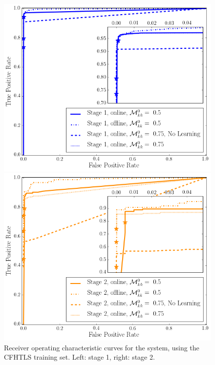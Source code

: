 \documentclass[useAMS,usenatbib,a4paper]{mn2e}
\begin{document}
\begin{figure}
\begin{minipage}{0.45\linewidth}
  \centering\includegraphics[width=\linewidth]{sw-system-figs/stage1_ROC.png}
\end{minipage}\hfill
\begin{minipage}{0.45\linewidth}
  \centering\includegraphics[width=\linewidth]{sw-system-figs/stage2_ROC.png}
\end{minipage}
\caption{Receiver operating characteristic curves for the \sw system, using
the CFHTLS training set. Left: stage 1, right: stage 2.}
\label{fig:results:sample:roc}
\end{figure}
\end{document}
